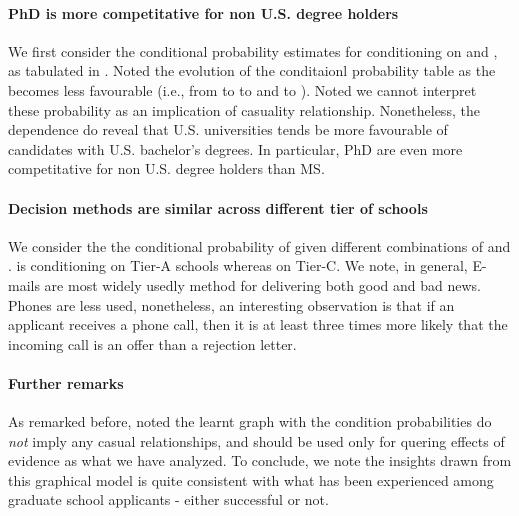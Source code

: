 		\paragraph{PhD is more competitative for non U.S. degree holders}
			We first consider the conditional probability estimates
			for  conditioning on  and , as tabulated
			in . Noted the evolution of the conditaionl probability table
			as the  becomes less favourable (i.e., from  to  to  and to ).
			Noted we cannot interpret these probability as an implication of casuality relationship. Nonetheless,
			the dependence do reveal that U.S. universities tends be more favourable of candidates with
			U.S. bachelor's degrees. In particular, PhD are even more competitative for non U.S. degree holders
			than MS.

		\paragraph{Decision methods are similar across different tier of schools}
			We consider the the conditional probability of 
			given different combinations of 
			and .  is conditioning
			on Tier-A schools whereas  on Tier-C.
			We note, in general, E-mails are most widely usedly method
			for delivering both good and bad news. Phones are less used,
			nonetheless, an interesting observation is that if an applicant
			receives a phone call, then it is at least three times more likely
			that the incoming call is an offer than a rejection letter.

		\paragraph{Further remarks}
			As remarked before, noted the learnt graph with the condition probabilities
			do \emph{not} imply any casual relationships, and should be used only for quering
			effects of evidence as what we have analyzed. To conclude, we note the insights
			drawn from this graphical model is quite consistent with what has been experienced among
			graduate school applicants - either successful or not.
